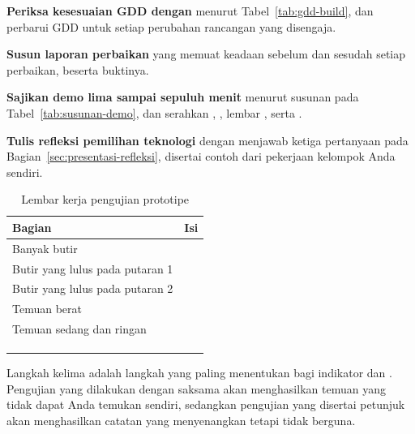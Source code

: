 \begin{praktikumbox}
\begin{langkah}
  \item \textbf{Periksa kesesuaian GDD dengan } menurut
        Tabel~\ref{tab:gdd-build}, dan perbarui GDD untuk setiap perubahan
        rancangan yang disengaja.

  \item \textbf{Susun laporan perbaikan} yang memuat keadaan sebelum dan
        sesudah setiap perbaikan, beserta buktinya.

  \item \textbf{Sajikan demo lima sampai sepuluh menit} menurut susunan pada
        Tabel~\ref{tab:susunan-demo}, dan serahkan ,
        , lembar , serta
        .

  \item \textbf{Tulis refleksi pemilihan teknologi} dengan menjawab ketiga
        pertanyaan pada Bagian~\ref{sec:presentasi-refleksi}, disertai contoh
        dari pekerjaan kelompok Anda sendiri.
\end{langkah}
\end{praktikumbox}

\begin{table}[htbp]
\centering
\caption{Lembar kerja pengujian prototipe}
\label{tab:lembar-praktikum-16}
{\setlength{\tabcolsep}{4pt}\footnotesize%
\begin{tabularx}{\textwidth}{@{}L{4.0cm} Y@{}}
\toprule
\headrow \textbf{Bagian} & \textbf{Isi} \\
\midrule
Banyak butir  & \\[1.3em]
\midrule
Butir yang lulus pada putaran 1 & \\[1.3em]
\midrule
Butir yang lulus pada putaran 2 & \\[1.3em]
\midrule
Temuan berat & \\[1.6em]
\midrule
Temuan sedang dan ringan & \\[1.6em]
\midrule
\addlinespace
{} \\[1.4em]
\addlinespace
{} \\[1.4em]
\addlinespace
{} \\[1.8em]
\bottomrule
\end{tabularx}}
\end{table}

\begin{catatabox}
Langkah kelima adalah langkah yang paling menentukan bagi indikator  dan
. Pengujian yang dilakukan dengan saksama akan menghasilkan temuan yang
tidak dapat Anda temukan sendiri, sedangkan pengujian yang disertai petunjuk
akan menghasilkan catatan yang menyenangkan tetapi tidak berguna.
\end{catatabox}
